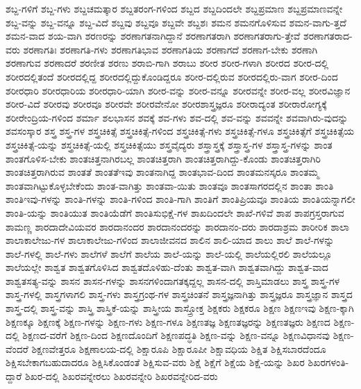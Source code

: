 {ಶಬ್ದ-ಗಳಿಗೆ
ಶಬ್ದ-ಗಳು
ಶಬ್ದಚಮತ್ಕಾರ
ಶಬ್ದತರಂಗ-ಗಳಿಂದ
ಶಬ್ದದ
ಶಬ್ದದಿಂದಲೇ
ಶಬ್ದಪ್ರಮಾಣ
ಶಬ್ದಪ್ರಮಾಣವನ್ನೇ
ಶಬ್ದ-ವನ್ನು
ಶಬ್ದ-ವನ್ನೂ
ಶಬ್ದ-ವಿದೆ
ಶಬ್ದವು
ಶಬ್ದವೂ
ಶಬ್ದವೇ
ಶಬ್ದಶಃ
ಶಮನ
ಶಮನಗೊಳಿಸುವ
ಶಮನ-ವಾಗು-ತ್ತದೆ
ಶಮನ-ವಾದ
ಶಯ-ವಾಗಿ
ಶರಣರನ್ನು
ಶರಣಾಗತನಾಗಿದ್ದಾನೆ
ಶರಣಾಗತರಾಗಿ
ಶರಣಾಗತರಾಗು-ತ್ತೇವೆ
ಶರಣಾಗತರಾದ-ವರು
ಶರಣಾಗತಿಃ
ಶರಣಾಗತಿ-ಗಳು
ಶರಣಾಗತಿಭಾವ
ಶರಣಾಗತಿಯ
ಶರಣಾಗದೆ
ಶರಣಾಗ-ಬೇಕು
ಶರಣಾಗಿ
ಶರಣಾಗುವ
ಶರಣಾದರೆ
ಶರಣೀತ
ಶರಣು
ಶರಾಬಿ-ಗಾಗಿ
ಶರಾಬು
ಶರೀರ
ಶರೀರ-ಗಳಾಗಿ
ಶರೀರದ
ಶರೀರ-ದಲ್ಲಿ
ಶರೀರದಲ್ಲಿತಂದೆ
ಶರೀರದಲ್ಲಿದ್ದ
ಶರೀರದಲ್ಲಿದ್ದುಕೊಂಡಿದ್ದರೂ
ಶರೀರ-ದಲ್ಲಿರುವ
ಶರೀರದಲ್ಲಿರು-ವಾಗ
ಶರೀರ-ದಿಂದ
ಶರೀರಧಾರಿ
ಶರೀರಧಾರಿಯ
ಶರೀರಧಾರಿ-ಯಾಗಿ
ಶರೀರ-ವನ್ನು
ಶರೀರ-ವನ್ನೂ
ಶರೀರವನ್ನೇ
ಶರೀರ-ವಲ್ಲ
ಶರೀರವಿಜ್ಞಾನ
ಶರೀರ-ವಿದೆ
ಶರೀರವು
ಶರೀರವೂ
ಶರೀರವೇ
ಶರೀರವೇನೋ
ಶರೀರಶಾಸ್ತ್ರಜ್ಞರೂ
ಶರೀರಾದ್ಯಂತ
ಶರೀರಾರೋಗ್ಯಕ್ಕೆ
ಶರೀರೇಂದ್ರಿಯ-ಗಳಿಂದ
ಶರ್ಮಾ
ಶಲಭಾಸನ
ಶವಕ್ಕೆ
ಶವ-ಗಳು
ಶವ-ದಲ್ಲಿ
ಶವ-ವನ್ನು
ಶವವನ್ನೇ
ಶವವಾಗಿರು-ವುದನ್ನು
ಶವಸಂಸ್ಕಾರ
ಶಸ್ತ್ರ
ಶಸ್ತ್ರ-ಗಳ
ಶಸ್ತ್ರಚಿಕಿತ್ಸೆ
ಶಸ್ತ್ರಚಿಕಿತ್ಸೆ-ಗಳಿಂದ
ಶಸ್ತ್ರಚಿಕಿತ್ಸೆ-ಗಳು
ಶಸ್ತ್ರಚಿಕಿತ್ಸೆ-ಗಳೂ
ಶಸ್ತ್ರಚಿಕಿತ್ಸೆಗೆ
ಶಸ್ತ್ರಚಿಕಿತ್ಸೆಯ
ಶಸ್ತ್ರಚಿಕಿತ್ಸೆ-ಯನ್ನು
ಶಸ್ತ್ರಚಿಕಿತ್ಸೆ-ಯಲ್ಲಿ
ಶಸ್ತ್ರಚಿಕಿತ್ಸೆಯು
ಶಸ್ತ್ರವೈದ್ಯರು
ಶಸ್ತ್ರಾಸ್ತ್ರಕ್ಕೆ
ಶಸ್ತ್ರಾಸ್ತ್ರ-ಗಳ
ಶಸ್ತ್ರಾಸ್ತ್ರ-ಗಳನ್ನು
ಶಾಂತ
ಶಾಂತಗೊಳಿಸ-ಬೇಕು
ಶಾಂತಚಿತ್ತನಾಗಿರಬಲ್ಲ
ಶಾಂತಚಿತ್ತರಾಗಿ
ಶಾಂತಚಿತ್ತರಾಗಿದ್ದು-ಕೊಂಡು
ಶಾಂತಚಿತ್ತರಾಗಿರಿ
ಶಾಂತಚಿತ್ತರಾಗಿರುವ
ಶಾಂತತೆ
ಶಾಂತತೆಇವು
ಶಾಂತನಾಗಿದ್ದ
ಶಾಂತಭಾವ-ದಿಂದ
ಶಾಂತಮನಸ್ಕರೂ
ಶಾಂತಮ್ಮ
ಶಾಂತವಾಗಿಟ್ಟುಕೊಳ್ಳಬೇಕೆಂದು
ಶಾಂತ-ವಾಗಿತ್ತು
ಶಾಂತವಾ-ಯಿತು
ಶಾಂತವೂ
ಶಾಂತಸಾಗರದಲ್ಲಿನ
ಶಾಂತಾ
ಶಾಂತಿ
ಶಾಂತಿಇವು-ಗಳನ್ನು
ಶಾಂತಿ-ಗಳನ್ನು
ಶಾಂತಿ-ಗಳಿಂದ
ಶಾಂತಿ-ಗಾಗಿ
ಶಾಂತಿಗೆ
ಶಾಂತಿಪ್ರಿಯವೂ
ಶಾಂತಿಯ
ಶಾಂತಿಯನ್ನಾಗಲೀ
ಶಾಂತಿ-ಯನ್ನು
ಶಾಂತಿಯುತ
ಶಾಂತಿಯೆಡೆಗೆ
ಶಾಂತಿಸುಭಿಕ್ಷೆ-ಗಳ
ಶಾಖದಿಂದಲೇ
ಶಾಖೆ-ಗಳಿವೆ
ಶಾಪ
ಶಾಪಗ್ರಸ್ತರಾಗುವ
ಶಾಮಣ್ಣ
ಶಾರದಾದೇವಿಯವರ
ಶಾರದಾನಂದರ
ಶಾರದಾನಂದರನ್ನು
ಶಾರದಾನಂ-ದರು
ಶಾರದಾಶ್ರಮ
ಶಾರೀರಿಕ
ಶಾಲಾ
ಶಾಲಾಕಾಲೇಜು-ಗಳ
ಶಾಲಾಕಾಲೇಜು-ಗಳಿಂದ
ಶಾಲಾಜೀವನದ
ಶಾಲಿನ
ಶಾಲಿ-ಯಾದ
ಶಾಲು
ಶಾಲೆ
ಶಾಲೆ-ಗಳನ್ನು
ಶಾಲೆ-ಗಳಲ್ಲಿ
ಶಾಲೆ-ಗಳು
ಶಾಲೆಗಳೆ
ಶಾಲೆಗೆ
ಶಾಲೆಯ
ಶಾಲೆ-ಯನ್ನು
ಶಾಲೆ-ಯಲ್ಲಿ
ಶಾಲೆಯಲ್ಲಿರಲಿ
ಶಾಲೆಯಲ್ಲೂ
ಶಾಲೆಯಲ್ಲೇ
ಶಾಶ್ವತ
ಶಾಶ್ವತಗೊಳಿಸಿದ
ಶಾಶ್ವತದೊಳಿಹು-ದೆಂತು
ಶಾಶ್ವತ-ವಾಗಿ
ಶಾಶ್ವತವಾಗಿದ್ದು
ಶಾಶ್ವತ-ವಾದ
ಶಾಶ್ವತಸತ್ಯ-ವನ್ನು
ಶಾಸನ
ಶಾಸನ-ಗಳನ್ನು
ಶಾಸನಗಳಿಂದಾಗತಕ್ಕದ್ದಲ್ಲ
ಶಾಸನ-ದಲ್ಲಿ
ಶಾಸ್ತಿಮಾಡಲು
ಶಾಸ್ತ್ರ
ಶಾಸ್ತ್ರ-ಗಳ
ಶಾಸ್ತ್ರ-ಗಳಲ್ಲಿ
ಶಾಸ್ತ್ರಗಳಾಗಲಿ
ಶಾಸ್ತ್ರ-ಗಳು
ಶಾಸ್ತ್ರಗ್ರಂಥ-ಗಳ
ಶಾಸ್ತ್ರಚಿಂತನೆ
ಶಾಸ್ತ್ರಜ್ಞನಾಗಿತ್ತು
ಶಾಸ್ತ್ರಜ್ಞರೂ
ಶಾಸ್ತ್ರಜ್ಞಾನ
ಶಾಸ್ತ್ರದ
ಶಾಸ್ತ್ರ-ದಲ್ಲಿ
ಶಾಸ್ತ್ರ-ವನ್ನು
ಶಾಸ್ತ್ರಿ
ಶಾಸ್ತ್ರಿಕೆ-ಯನ್ನು
ಶಾಸ್ತ್ರೀಯ
ಶಾಸ್ತ್ರೋಕ್ತ
ಶಿಕ್ಷಕರು
ಶಿಕ್ಷಕರೂ
ಶಿಕ್ಷಣ
ಶಿಕ್ಷಣಇವು
ಶಿಕ್ಷಣ-ಕ್ಕಾಗಿ
ಶಿಕ್ಷಣಕ್ಕೂ
ಶಿಕ್ಷಣಕ್ಕೆ
ಶಿಕ್ಷಣ-ಗಳನ್ನು
ಶಿಕ್ಷಣ-ಗಳು
ಶಿಕ್ಷಣ-ಗಳೂ
ಶಿಕ್ಷಣತಜ್ಞ
ಶಿಕ್ಷಣತಜ್ಞರನ್ನು
ಶಿಕ್ಷಣತಜ್ಞರು
ಶಿಕ್ಷಣದ
ಶಿಕ್ಷಣ-ದಲ್ಲಿ
ಶಿಕ್ಷಣದ-ವರೆಗೆ
ಶಿಕ್ಷಣ-ದಿಂದ
ಶಿಕ್ಷಣದೊಂದಿಗೆ
ಶಿಕ್ಷಣಪದ್ಧತಿ
ಶಿಕ್ಷಣ-ವನ್ನು
ಶಿಕ್ಷಣ-ವನ್ನೂ
ಶಿಕ್ಷಣವಿಧಾನವು
ಶಿಕ್ಷಣ-ವೆಂದರೆ
ಶಿಕ್ಷಣವೇತ್ತರೂ
ಶಿಕ್ಷಣಾಲಯ-ದಲ್ಲಿ
ಶಿಕ್ಷಾರೂಪಿ
ಶಿಕ್ಷಾರೂಪೀ
ಶಿಕ್ಷಾವಧಿಯ
ಶಿಕ್ಷಿತ
ಶಿಕ್ಷಿಸಬಾರದೆಂದೂ
ಶಿಕ್ಷಿಸಬೇಕಾಗಬಹುದಾದರೂ
ಶಿಕ್ಷಿಸಿಕೊಂಡಂತೆ
ಶಿಕ್ಷಿಸುವ-ವರು
ಶಿಕ್ಷೆ
ಶಿಕ್ಷೆಗೆ
ಶಿಕ್ಷೆಯ
ಶಿಕ್ಷೆ-ಯನ್ನು
ಶಿಖರ
ಶಿಖರಗಳಂತಿ-ದ್ದಾರೆ
ಶಿಖರ-ದಲ್ಲಿ
ಶಿಖರವನ್ನೇರಲು
ಶಿಖರವನ್ನೇರಿ
ಶಿಖರವನ್ನೇರಿದ-ವರು
}
